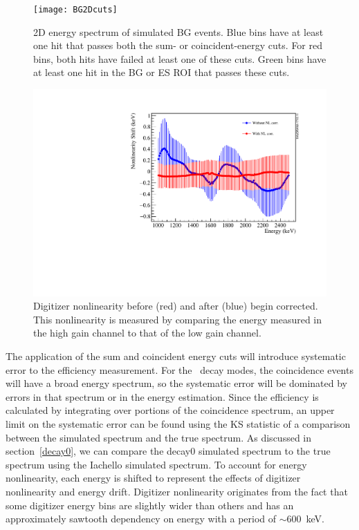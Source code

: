 \documentclass[/main.tex]{subfiles}
\begin{document}
\begin{figure}[h]
  \centering
  \texttt{[image: BG2Dcuts]}
  \caption[2D energy spectrum of simulated BG events]{\label{fig:2Dcuts}
    2D energy spectrum of simulated BG events. Blue bins have at least one hit that passes both the sum- or coincident-energy cuts. For red bins, both hits have failed at least one of these cuts. Green bins have at least one hit in the BG or ES ROI that passes these cuts.
    }
\end{figure}

\begin{figure}[h]
  \centering
  \includegraphics[width=0.8\linewidth]{DigitizerNonlinearity}
  \caption[Measured Digitizer Nonlinearity vs Energy]{\label{fig:dignonlin}
    Digitizer nonlinearity before (red) and after (blue) begin corrected. This nonlinearity is measured by comparing the energy measured in the high gain channel to that of the low gain channel.
  }
\end{figure}
The application of the sum and coincident energy cuts will introduce systematic error to the efficiency measurement.
For the \tnbb\ decay modes, the coincidence events will have a broad energy spectrum, so the systematic error will be dominated by errors in that spectrum or in the energy estimation.
Since the efficiency is calculated by integrating over portions of the coincidence spectrum, an upper limit on the systematic error can be found using the KS statistic of a comparison between the simulated spectrum and the true spectrum.
As discussed in section~\ref{decay0}, we can compare the decay0 simulated spectrum to the true spectrum using the Iachello simulated spectrum.
To account for energy nonlinearity, each energy is shifted to represent the effects of digitizer nonlinearity and energy drift.
Digitizer nonlinearity originates from the fact that some digitizer energy bins are slightly wider than others and has an approximately sawtooth dependency on energy with a period of $\sim600$~keV.
\end{document}
